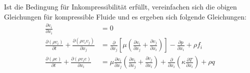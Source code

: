Ist die Bedingung für Inkompressibilität erfüllt,
vereinfachen sich die obigen Gleichungen für kompressible Fluide und es ergeben sich folgende Gleichungen:
\begin{align}
  \frac{\partial v_i}{\partial x_i} &= 0\\
  \frac{\partial (\rho v_i)}{\partial t} + \frac{\partial (\rho v_i v_j)}{\partial x_j} &=
  \frac{\partial}{\partial x_j} \left[{\mu
  \left({\frac{\partial v_i}{\partial x_j}
  +\frac{\partial v_j}{\partial x_i}}\right)}\right]
  -\frac{\partial p}{\partial x_i} + \rho f_i\\
  \frac{\partial (\rho e)}{\partial t} + \frac{\partial (\rho v_i e)}{\partial x_i} &=
  \mu \frac{\partial v_i}{\partial x_j}
  \left({\frac{\partial v_i}{\partial x_j}
  +\frac{\partial v_j}{\partial x_i}}\right)
  +\frac{\partial}{\partial x_i}
  \left({\kappa \frac{\partial T}{\partial x_i}}\right)
  + \rho q
\end{align}
\clearpage

